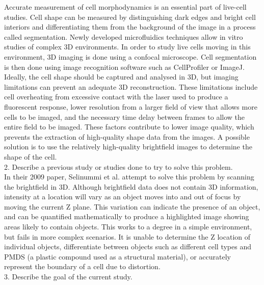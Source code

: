 \documentclass[12pt]{article}
\begin{document}
Accurate measurement of cell morphodynamics is an essential part of live-cell studies. Cell shape can be measured by distinguishing dark edges and bright cell interiors and differentiating them from the background of the image in a process called segmentation. Newly developed microfluidics techniques allow in vitro studies of complex 3D environments. In order to study live cells moving in this environment, 3D imaging is done using a confocal microscope. Cell segmentation is then done using image recognition software such as CellProfiler or ImageJ. Ideally, the cell shape should be captured and analysed in 3D, but imaging limitations can prevent an adequate 3D reconstruction. These limitations include cell overheating from excessive contact with the laser used to produce a fluorescent response, lower resolution from a larger field of view that allows more cells to be imaged, and the necessary time delay between frames to allow the entire field to be imaged. These factors contribute to lower image quality, which prevents the extraction of high-quality shape data from the images. A possible solution is to use the relatively high-quality brightfield images to determine the shape of the cell. \\

2. Describe a previous study or studies done to try to solve this problem. \\

In their 2009 paper, Selinummi et al. attempt to solve this problem by scanning the brightfield in 3D. Although brightfield data does not contain 3D information, intensity at a location will vary as an object moves into and out of focus by moving the current Z plane. This variation can indicate the presence of an object, and can be quantified mathematically to produce a highlighted image showing areas likely to contain objects. This works to a degree in a simple environment, but fails in more complex scenarios. It is unable to determine the Z location of individual objects, differentiate between objects such as different cell types and PMDS (a plastic compound used as a structural material), or accurately represent the boundary of a cell due to distortion. \\

3. Describe the goal of the current study. \\
\end{document}
